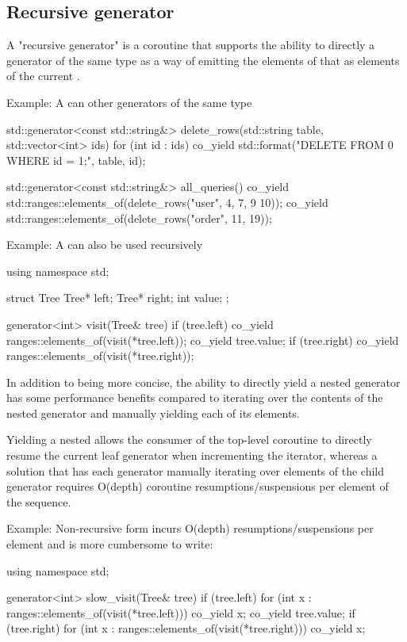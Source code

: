 \documentclass{wg21}
\begin{document}
\subsection{Recursive generator}

A "recursive generator" is a coroutine that supports the ability to directly 
a generator of the same type as a way of emitting the elements of that 
as elements of the current .

Example: A  can  other generators of the same type
\begin{colorblock}
    std::generator<const std::string&> delete_rows(std::string table, std::vector<int> ids) {
        for (int id : ids) {
            co_yield std::format("DELETE FROM {0} WHERE id = {1};", table, id);
        }
    }

    std::generator<const std::string&> all_queries() {
        co_yield std::ranges::elements_of(delete_rows("user", {4, 7, 9 10}));
        co_yield std::ranges::elements_of(delete_rows("order", {11, 19}));
    }
\end{colorblock}

Example: A  can also be used recursively
\begin{colorblock}
    using namespace std;

    struct Tree {
        Tree* left;
        Tree* right;
        int value;
    };

    generator<int> visit(Tree& tree) {
        if (tree.left) co_yield ranges::elements_of(visit(*tree.left));
        co_yield tree.value;
        if (tree.right) co_yield ranges::elements_of(visit(*tree.right));
    }
\end{colorblock}

In addition to being more concise, the ability to directly yield a nested generator has some
performance benefits compared to iterating over the contents of the nested generator and
manually yielding each of its elements.

Yielding a nested  allows the consumer of the top-level coroutine to
directly resume the current leaf generator when incrementing the iterator, whereas a solution that has each generator manually iterating over elements of the child generator
requires O(depth) coroutine resumptions/suspensions per element of the sequence.

Example: Non-recursive form incurs O(depth) resumptions/suspensions per element
and is more cumbersome to write:
\begin{colorblock}
    using namespace std;

    generator<int> slow_visit(Tree& tree) {
        if (tree.left) {
            for (int x : ranges::elements_of(visit(*tree.left)))
                co_yield x;
        }
        co_yield tree.value;
        if (tree.right) {
            for (int x : ranges::elements_of(visit(*tree.right)))
                co_yield x;
        }
    }
\end{colorblock}
\end{document}
